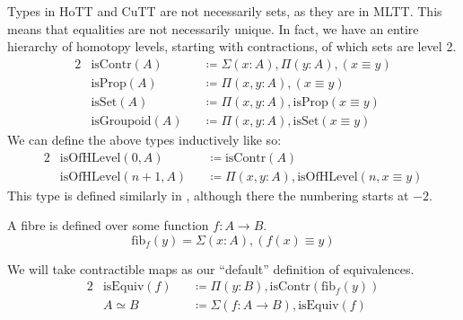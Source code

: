 \begin{romdefinition} \label{homotopy-types}
  Types in HoTT and CuTT are not necessarily sets, as they are in MLTT.
  This means that equalities are not necessarily unique.
  In fact, we have an entire hierarchy of homotopy levels, starting with
  contractions, of which sets are level 2.
  \begin{alignat}{2}
    &\text{isContr}(A)    &&\coloneqq \Sigma(x : A) , \Pi(y : A) , (x \equiv y) \\
    &\text{isProp}(A)     &&\coloneqq \Pi(x, y : A) , (x \equiv y) \\
    &\text{isSet}(A)      &&\coloneqq \Pi(x, y : A) , \text{isProp}(x \equiv y) \\
    &\text{isGroupoid}(A) &&\coloneqq \Pi(x, y : A) , \text{isSet}(x \equiv y)
  \end{alignat}
  We can define the above types inductively like so:
  \begin{alignat}{2}
    &\text{isOfHLevel}(0 , A)   &&\coloneqq \text{isContr}(A) \\
    &\text{isOfHLevel}(n+1 , A) &&\coloneqq \Pi(x , y : A) , \text{isOfHLevel}(n , x \equiv y)
  \end{alignat}
  This type is defined similarly in \cite[definition 7.1.1]{hottbook}, although
  there the numbering starts at \(-2\).
\end{romdefinition}
\begin{romdefinition}[Fibres] \label{fibres}
  A fibre \cite[definition 4.2.4]{hottbook} is defined over some function \(f :
  A \rightarrow B\).
  \begin{equation}
    \text{fib}_f(y) = \Sigma(x : A) , (f (x) \equiv y)
  \end{equation}
\end{romdefinition}
\begin{romdefinition}[Equivalences] \label{equivalences}
  We will take contractible maps \cite[definition 4.4.1]{hottbook} as our
  ``default'' definition of equivalences.
  \begin{alignat}{2}
    &\text{isEquiv}(f) &&\coloneqq \Pi(y : B) , \text{isContr}(\text{fib}_f(y)) \label{is-equiv-def} \\
    &A \simeq B        &&\coloneqq \Sigma(f : A \rightarrow B) , \text{isEquiv}(f)
  \end{alignat}
\end{romdefinition}
